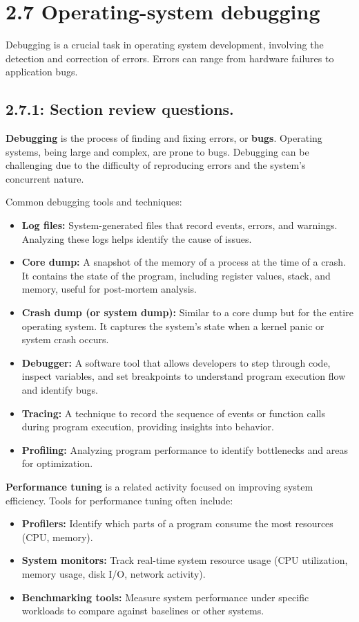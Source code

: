 \section*{2.7 Operating-system debugging}

Debugging is a crucial task in operating system development, involving the detection and correction of errors. Errors can range from hardware failures to application bugs.

\subsection*{2.7.1: Section review questions.}

\textbf{Debugging} is the process of finding and fixing errors, or \textbf{bugs}. Operating systems, being large and complex, are prone to bugs. Debugging can be challenging due to the difficulty of reproducing errors and the system's concurrent nature.

Common debugging tools and techniques:
\begin{itemize}
    \item \textbf{Log files:} System-generated files that record events, errors, and warnings. Analyzing these logs helps identify the cause of issues.
    \item \textbf{Core dump:} A snapshot of the memory of a process at the time of a crash. It contains the state of the program, including register values, stack, and memory, useful for post-mortem analysis.
    \item \textbf{Crash dump (or system dump):} Similar to a core dump but for the entire operating system. It captures the system's state when a kernel panic or system crash occurs.
    \item \textbf{Debugger:} A software tool that allows developers to step through code, inspect variables, and set breakpoints to understand program execution flow and identify bugs.
    \item \textbf{Tracing:} A technique to record the sequence of events or function calls during program execution, providing insights into behavior.
    \item \textbf{Profiling:} Analyzing program performance to identify bottlenecks and areas for optimization.
\end{itemize}

\textbf{Performance tuning} is a related activity focused on improving system efficiency. Tools for performance tuning often include:
\begin{itemize}
    \item \textbf{Profilers:} Identify which parts of a program consume the most resources (CPU, memory).
    \item \textbf{System monitors:} Track real-time system resource usage (CPU utilization, memory usage, disk I/O, network activity).
\item \textbf{Benchmarking tools:} Measure system performance under specific workloads to compare against baselines or other systems.
\end{itemize}

